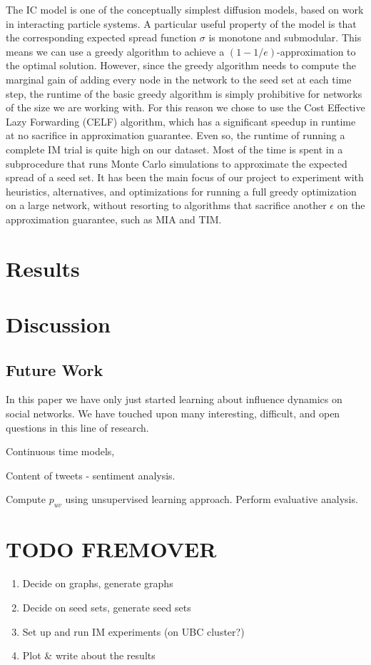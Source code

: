 \documentclass[sigconf]{acmart}
\begin{document}
The IC model is one of the conceptually simplest diffusion models, based on work in interacting particle systems. A particular useful property of the model is that the corresponding expected spread function $\sigma$ is monotone and submodular. This means we can use a greedy algorithm to achieve a $(1 - 1/e)$-approximation to the optimal solution. However, since the greedy algorithm needs to compute the marginal gain of adding every node in the network to the seed set at each time step, the runtime of the basic greedy algorithm is simply prohibitive for networks of the size we are working with. For this reason we chose to use the Cost Effective Lazy Forwarding (CELF) algorithm, which has a significant speedup in runtime at no sacrifice in approximation guarantee. Even so, the runtime of running a complete IM trial is quite high on our dataset. Most of the time is spent in a subprocedure that runs Monte Carlo simulations to approximate the expected spread of a seed set. It has been the main focus of our project to experiment with heuristics, alternatives, and optimizations for running a full greedy optimization on a large network, without resorting to algorithms that sacrifice another $\epsilon$ on the approximation guarantee, such as MIA and TIM.

\section{Results} 

\section{Discussion}

\subsection{Future Work}

In this paper we have only just started learning about influence dynamics on social networks. We have touched upon many interesting, difficult, and open questions in this line of research. 

Continuous time models, 

Content of tweets - sentiment analysis. 

Compute $p_{uv}$ using unsupervised learning approach. Perform evaluative analysis. 

\section*{TODO FREMOVER}
\begin{enumerate}
\item Decide on graphs, generate graphs
\item Decide on seed sets, generate seed sets
\item Set up and run IM experiments (on UBC cluster?)
\item Plot \& write about the results
\end{enumerate}

\nocite{*}


\end{document}
